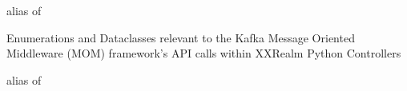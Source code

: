 \documentclass[letterpaper,10pt,english]{sphinxmanual}
\begin{document}

\begin{fulllineitems}
\label{\detokenize{Raven:Raven.MOM_PROPERTIES}}
\sphinxAtStartPar
alias of 

\end{fulllineitems}


\begin{fulllineitems}
\label{\detokenize{Raven:Raven.MOM_ROUTINE_PAIR}}
\sphinxAtStartPar
Enumerations and Dataclasses relevant to the Kafka Message Oriented Middleware (MOM) framework’s API calls within
XXRealm Python Controllers

\sphinxAtStartPar
alias of 

\end{fulllineitems}

\end{document}
